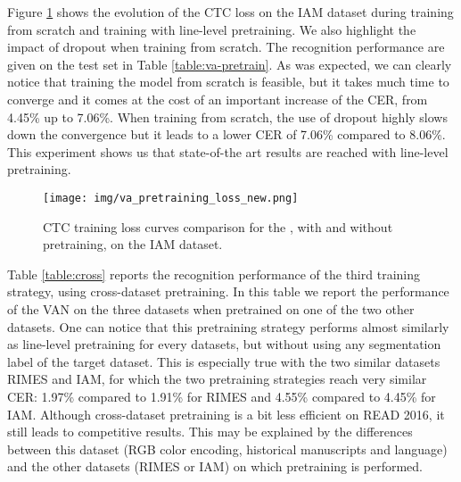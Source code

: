 Figure \ref{fig:curves-pretraining} shows the evolution of the CTC loss on the IAM dataset during training from scratch and training with line-level pretraining. We also highlight the impact of dropout when training from scratch. The recognition performance are given on the test set in Table \ref{table:va-pretrain}. As was expected, we can clearly notice that training the model from scratch is feasible, but it takes much time to converge and it comes at the cost of an important increase of the CER, from 4.45\% up to 7.06\%. When training from scratch, the use of dropout highly slows down the convergence but it leads to a lower CER of 7.06\% compared to 8.06\%. This experiment shows us that state-of-the art results are reached with line-level pretraining.


\begin{figure}[htbp!]
\centering
\texttt{[image: img/va\_pretraining\_loss\_new.png]}
        \caption{CTC training loss curves comparison for the \modelacc{}, with and without pretraining, on the IAM dataset.}
        \label{fig:curves-pretraining}

\end{figure}


\begin{table}[!h]
    \caption{Impact of the pretraining on lines for the \modelacc. Results are given on the test set of the IAM dataset.}
    \centering
    \label{table:va-pretrain}
\end{table}



Table \ref{table:cross} reports the recognition performance of the third training strategy, using cross-dataset pretraining. In this table we report the performance of the VAN on the three datasets when pretrained on one of the two other datasets. One can notice that this pretraining strategy performs almost similarly as line-level pretraining for every datasets, but without using any segmentation label of the target dataset. This is especially true with the two similar datasets RIMES and IAM, for which the two pretraining strategies reach very similar CER: 1.97\% compared to 1.91\% for RIMES and 4.55\% compared to 4.45\% for IAM.  
Although cross-dataset pretraining is a bit less efficient on READ 2016, it still leads to competitive results. This may be explained by the differences between this dataset (RGB color encoding, historical manuscripts and language) and the other datasets (RIMES or IAM) on which pretraining is performed.

